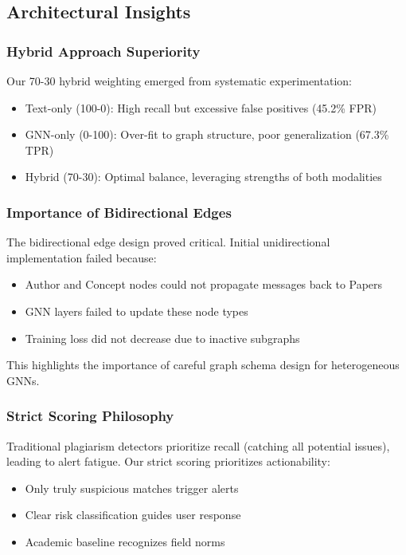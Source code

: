 \documentclass[conference]{IEEEtran}
\begin{document}
\subsection{Architectural Insights}

\subsubsection{Hybrid Approach Superiority}
Our 70-30 hybrid weighting emerged from systematic experimentation:
\begin{itemize}
    \item Text-only (100-0): High recall but excessive false positives (45.2\% FPR)
    \item GNN-only (0-100): Over-fit to graph structure, poor generalization (67.3\% TPR)
    \item Hybrid (70-30): Optimal balance, leveraging strengths of both modalities
\end{itemize}

\subsubsection{Importance of Bidirectional Edges}
The bidirectional edge design proved critical. Initial unidirectional implementation failed because:
\begin{itemize}
    \item Author and Concept nodes could not propagate messages back to Papers
    \item GNN layers failed to update these node types
    \item Training loss did not decrease due to inactive subgraphs
\end{itemize}

This highlights the importance of careful graph schema design for heterogeneous GNNs.

\subsubsection{Strict Scoring Philosophy}
Traditional plagiarism detectors prioritize recall (catching all potential issues), leading to alert fatigue. Our strict scoring prioritizes actionability:
\begin{itemize}
    \item Only truly suspicious matches trigger alerts
    \item Clear risk classification guides user response
    \item Academic baseline recognizes field norms
\end{itemize}
\end{document}
